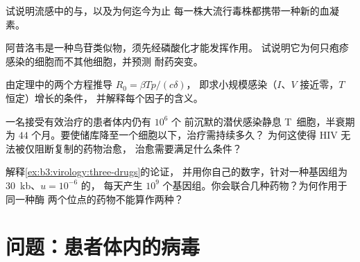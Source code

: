\begin{exercise}[$\star\star$]\label{exo:b3:virology:8}
试说明流感中的与，以及为何迄今为止
每一株大流行毒株都携带一种新的血凝素。
\end{exercise}

\begin{exercise}[$\star\star$]\label{exo:b3:virology:9}
阿昔洛韦是一种鸟苷类似物，须先经磷酸化才能发挥作用。
试说明它为何只疱疹感染的细胞而不其他细胞，并预测
耐药突变。
\end{exercise}

\begin{exercise}[$\star\star\star$]\label{exo:b3:virology:10}
由定理中的两个方程推导 $R_{0} = \beta Tp/(c\delta)$，
即求小规模感染（$I$、$V$ 接近零，$T$ 恒定）增长的条件，
并解释每个因子的含义。
\end{exercise}

\begin{exercise}[$\star\star\star$]\label{exo:b3:virology:11}
一名接受有效治疗的患者体内仍有 $10^{6}$ 个
前沉默的潜伏感染静息 T~细胞，半衰期为
$44$ 个月。要使储库降至一个细胞以下，治疗需持续多久？
为何这使得 HIV 无法被仅阻断复制的药物治愈，
治愈需要满足什么条件？
\end{exercise}

\begin{exercise}[$\star\star\star$]\label{exo:b3:virology:12}
解释\cref{ex:b3:virology:three-drugs}的论证，
并用你自己的数字，针对一种基因组为 \qty{30}{kb}、$u = 10^{-6}$ 的，
每天产生 $10^{9}$ 个基因组。你会联合几种药物？为何作用于同一种酶
两个位点的药物不能算作两种？
\end{exercise}

\section{问题：患者体内的病毒}

